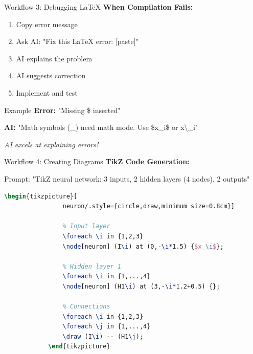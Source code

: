 \documentclass[aspectratio=169]{beamer}
\begin{document}
	\begin{frame}{Workflow 3: Debugging LaTeX}
		\textbf{When Compilation Fails:}
		
		\begin{enumerate}
			\item Copy error message
			\item Ask AI: "Fix this LaTeX error: [paste]"
			\item AI explains the problem
			\item AI suggests correction
			\item Implement and test
		\end{enumerate}
		
		\vspace{0.5em}
		
		\begin{exampleblock}{Example}
			\textbf{Error:} "Missing \$ inserted"
			
			\textbf{AI:} "Math symbols (\_) need math mode. Use \$x\_i\$ or x\textbackslash\_i"
		\end{exampleblock}
		
		\vspace{0.3em}
		
		\textit{AI excels at explaining errors!}
	\end{frame}
	
	\begin{frame}[fragile]{Workflow 4: Creating Diagrams}
		\textbf{TikZ Code Generation:}
		
		Prompt: "TikZ neural network: 3 inputs, 2 hidden layers (4 nodes), 2 outputs"
		
		\vspace{0.3em}
		
		\begin{lstlisting}[language=TeX,basicstyle=\ttfamily\tiny]
			\begin{tikzpicture}[
				neuron/.style={circle,draw,minimum size=0.8cm}]
				
				% Input layer
				\foreach \i in {1,2,3}
				\node[neuron] (I\i) at (0,-\i*1.5) {$x_\i$};
				
				% Hidden layer 1
				\foreach \i in {1,...,4}
				\node[neuron] (H1\i) at (3,-\i*1.2+0.5) {};
				
				% Connections
				\foreach \i in {1,2,3}
				\foreach \j in {1,...,4}
				\draw (I\i) -- (H1\j);
			\end{tikzpicture}
		\end{lstlisting}
	\end{frame}
	
\end{document}
